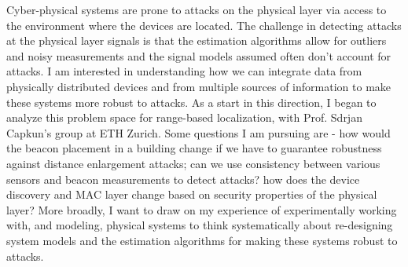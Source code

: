 \documentclass[10pt]{article}
\begin{document}
Cyber-physical systems are prone to attacks on the physical layer via
access to the environment where the devices are located.  The challenge in detecting attacks at the physical layer signals is that %
the estimation algorithms allow for
outliers and noisy measurements and the signal models assumed often don't
account for attacks. 
I am interested in understanding how we can integrate
data from physically distributed devices and from multiple sources of
information to make these systems more robust to attacks. As a start
in this direction, I began to analyze this problem space for
range-based localization, with Prof. Sdrjan Capkun's group at ETH
Zurich. 
Some questions I
am pursuing are - how would the beacon placement in a building change
if we have to guarantee robustness against distance enlargement attacks; can we use
consistency between various sensors and beacon measurements to detect attacks? 
how does the device discovery and MAC layer change based on security
properties of the physical layer? More broadly, I want to draw on my experience of experimentally
working with, and modeling, physical systems to think systematically
about re-designing system models and the estimation algorithms for
making these systems robust to attacks. %

\end{document}
